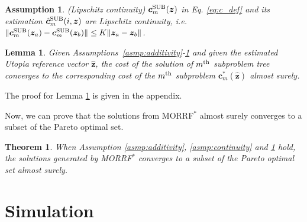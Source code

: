 \documentclass{article}
\newtheorem{thm}{Theorem}
\newtheorem{lem}{Lemma}
\newtheorem{asmp}{Assumption}
\begin{document}
\begin{asmp}{(Lipschitz continuity)}
\label{asmp:lipschitz}
$ \bm{c}^{\rm SUB}_{m} ( \bm{z} )  $ in Eq. \eqref{eq:c_def} and its estimation $ \hat{ \bm{c} }^{\rm SUB}_{m} ( i, \bm{z} ) $ are Lipschitz continuity, i.e.
$ \lVert \bm{c}^{\rm SUB}_{m} ( \bm{z}_{a} ) - \bm{c}^{\rm SUB}_{m} ( \bm{z}_{b} ) \rVert \leq K \lVert \bm{z}_{a} - \bm{z}_{b} \rVert $.
\end{asmp}

\begin{lem}
\label{lem:sub_tree:conv}
Given Assumptions~\ref{asmp:additivity}-\ref{asmp:lipschitz} and given the estimated Utopia reference vector $ \hat{\bm{z}} $,
the cost of the solution of $ m^{\rm th} $ subproblem tree converges to the corresponding cost of the $ m^{\rm th} $ subproblem $ \bm{c}_{m}^{*} ( \hat{\bm{z}} ) $ almost surely.
\end{lem}
The proof for Lemma \ref{lem:sub_tree:conv} is given in the appendix.

Now, we can prove that the solutions from MORRF$^{*}$ almost surely converges to a subset of the Pareto optimal set.

\begin{thm}
\label{thm:morrt:conv}
When Assumption \ref{asmp:additivity}, \ref{asmp:continuity} and \ref{asmp:lipschitz} hold,
the solutions generated by MORRF$^{*} $ converges to a subset of the Pareto optimal set almost surely.
\end{thm}

\section{Simulation}
\label{sec:simulation}

\end{document}
